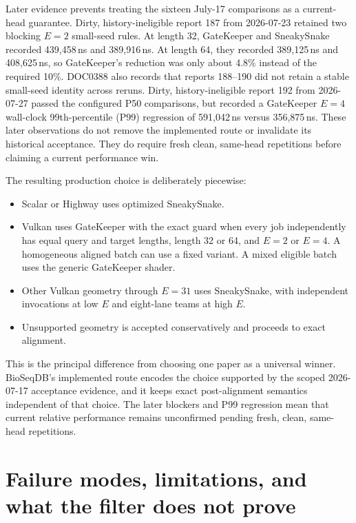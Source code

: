 Later evidence prevents treating the sixteen July-17 comparisons as a
current-head guarantee.  Dirty, history-ineligible report 187 from 2026-07-23
retained two blocking \(E=2\) small-seed rules.  At length 32, GateKeeper and
SneakySnake recorded 439,458\,ns and 389,916\,ns.  At length 64, they recorded
389,125\,ns and 408,625\,ns, so GateKeeper's reduction was only about 4.8\%
instead of the required 10\%.  DOC0388 also records that reports 188--190 did
not retain a stable small-seed identity across reruns.  Dirty,
history-ineligible report 192 from 2026-07-27 passed the configured P50
comparisons, but recorded a GateKeeper \(E=4\) wall-clock 99th-percentile
(P99) regression of
591,042\,ns versus 356,875\,ns.  These later observations do not remove the
implemented route or invalidate its historical acceptance.  They do require
fresh clean, same-head repetitions before claiming a current performance win.

The resulting production choice is deliberately piecewise:

\begin{itemize}
    \item Scalar or Highway uses optimized SneakySnake.
    \item Vulkan uses GateKeeper with the exact guard when every job
    independently has equal query and target lengths, length 32 or 64, and
    \(E=2\) or \(E=4\).  A homogeneous aligned batch can use a fixed variant.
    A mixed eligible batch uses the generic GateKeeper shader.
    \item Other Vulkan geometry through \(E=31\) uses SneakySnake, with
    independent invocations at low \(E\) and eight-lane teams at high \(E\).
    \item Unsupported geometry is accepted conservatively and proceeds to
    exact alignment.
\end{itemize}

This is the principal difference from choosing one paper as a universal
winner.  \mbox{BioSeqDB}'s implemented route encodes the choice supported by the
scoped 2026-07-17 acceptance evidence, and it keeps exact post-alignment
semantics independent of that choice.  The later blockers and P99 regression
mean that current relative performance remains unconfirmed pending fresh,
clean, same-head repetitions.

\section{Failure modes, limitations, and what the filter does not prove}
\label{sec:prefilter-limitations}

